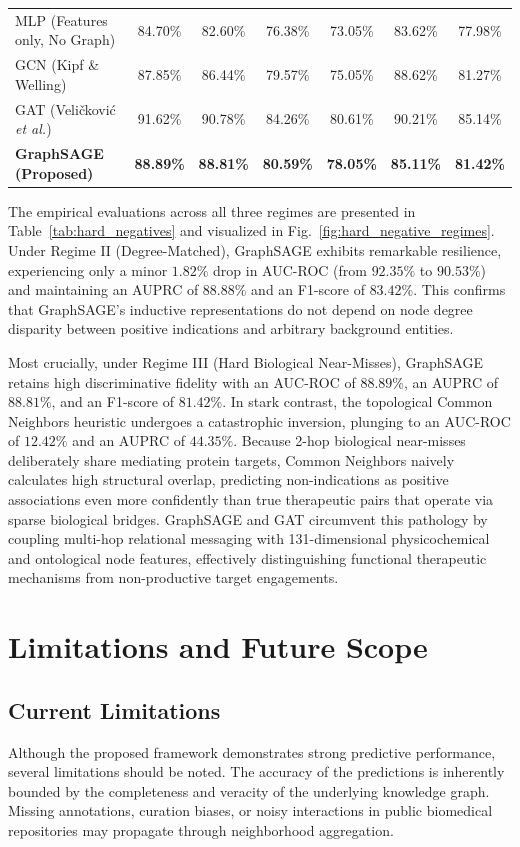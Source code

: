 \documentclass[conference,a4paper]{IEEEtran}
\begin{document}
\begin{table}[!t]
{\begin{tabular}{lcccccc}
        MLP (Features only, No Graph)    & 84.70\% & 82.60\% & 76.38\% &  73.05\% & 83.62\% & 77.98\% \\
        GCN (Kipf \& Welling)~\cite{ref2} & 87.85\% & 86.44\% & 79.57\% &  75.05\% & 88.62\% & 81.27\% \\
        GAT (Veli\v{c}kovi\'c \textit{et al.})~\cite{ref_gat} & 91.62\% & 90.78\% & 84.26\% &  80.61\% & 90.21\% & 85.14\% \\
        \textbf{GraphSAGE (Proposed)}     & \textbf{88.89\%} & \textbf{88.81\%} & \textbf{80.59\%} &  \textbf{78.05\%} & \textbf{85.11\%} & \textbf{81.42\%} \\
        \bottomrule
    \end{tabular}%
    }
\end{table}

The empirical evaluations across all three regimes are presented in Table~\ref{tab:hard_negatives} and visualized in Fig.~\ref{fig:hard_negative_regimes}. Under Regime II (Degree-Matched), GraphSAGE exhibits remarkable resilience, experiencing only a minor $1.82\%$ drop in AUC-ROC (from $92.35\%$ to $90.53\%$) and maintaining an AUPRC of $88.88\%$ and an F1-score of $83.42\%$. This confirms that GraphSAGE's inductive representations do not depend on node degree disparity between positive indications and arbitrary background entities.

Most crucially, under Regime III (Hard Biological Near-Misses), GraphSAGE retains high discriminative fidelity with an AUC-ROC of $88.89\%$, an AUPRC of $88.81\%$, and an F1-score of $81.42\%$. In stark contrast, the topological Common Neighbors heuristic undergoes a catastrophic inversion, plunging to an AUC-ROC of $12.42\%$ and an AUPRC of $44.35\%$. Because 2-hop biological near-misses deliberately share mediating protein targets, Common Neighbors naively calculates high structural overlap, predicting non-indications as positive associations even more confidently than true therapeutic pairs that operate via sparse biological bridges. GraphSAGE and GAT circumvent this pathology by coupling multi-hop relational messaging with 131-dimensional physicochemical and ontological node features, effectively distinguishing functional therapeutic mechanisms from non-productive target engagements.

\section{Limitations and Future Scope}

\subsection{Current Limitations}
Although the proposed framework demonstrates strong predictive performance, several limitations should be noted. The accuracy of the predictions is inherently bounded by the completeness and veracity of the underlying knowledge graph. Missing annotations, curation biases, or noisy interactions in public biomedical repositories may propagate through neighborhood aggregation.
\end{document}
